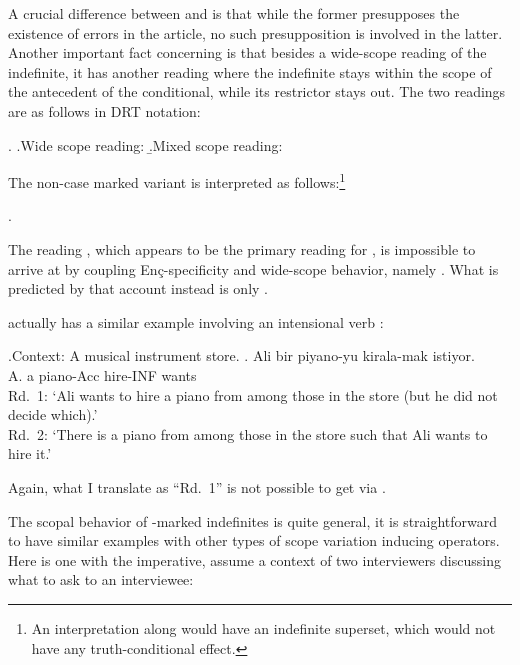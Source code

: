 \documentclass[11pt,a4paper]{article}
\newcommand{\encspec}{Enç-specific}
\begin{document}
A crucial difference between  and  is that while the former presupposes the existence of errors in the article, no such presupposition is involved in the latter. Another important fact concerning  is that besides a wide-scope reading of the indefinite, it has another reading where the indefinite stays within the scope of the antecedent of the conditional, while its restrictor stays out. The two readings are as follows in DRT notation:

\ex. 
\a.\label{condawide}Wide scope reading:
\b.\label{condanar}Mixed scope reading:


The non-case marked variant  is interpreted as follows:\footnote{An interpretation along  would have an indefinite superset, which would not have any truth-conditional effect.}

\ex. 


The reading , which appears to be the primary reading for , is impossible to arrive at by coupling \encspec ity and wide-scope behavior, namely . What is predicted by that account instead is only .

 actually has a similar example involving an intensional verb :

\ex.Context: A musical instrument store.
\ag. Ali bir piyano-yu kirala-mak istiyor.\\
A. a piano-Acc hire-INF wants\\
Rd.\ 1: `Ali wants to hire a piano from among those in the store (but he did not decide which).'\\
Rd.\ 2: `There is a piano from among those in the store such that Ali wants to hire it.'

Again, what I translate as ``Rd.\ 1'' is not possible to get via .

The scopal behavior of \acc-marked indefinites is quite general, it is
straightforward to have similar examples with other types of scope variation
inducing operators. Here is one with the imperative, assume a context of two
interviewers discussing what to ask to an interviewee:
\end{document}
